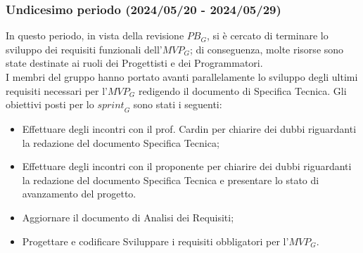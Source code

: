 \subsubsection{Undicesimo periodo (2024/05/20 - 2024/05/29)}
In questo periodo, in vista della revisione $\textit{PB}_G$, si è cercato di terminare lo sviluppo dei requisiti funzionali dell'$\textit{MVP}_G$; di conseguenza, molte risorse sono state destinate ai ruoli dei Progettisti e dei Programmatori. \\
I membri del gruppo hanno portato avanti parallelamente lo sviluppo degli ultimi requisiti necessari per l'$\textit{MVP}_G$ redigendo il documento di Specifica Tecnica.
Gli obiettivi posti per lo $\textit{sprint}_G$ sono stati i seguenti:
\begin{itemize}
    \item Effettuare degli incontri con il prof. Cardin per chiarire dei dubbi riguardanti la redazione del documento Specifica Tecnica;
    \item Effettuare degli incontri con il proponente per chiarire dei dubbi riguardanti la redazione del documento Specifica Tecnica e presentare lo stato di avanzamento del progetto.
    \item Aggiornare il documento di Analisi dei Requisiti;
    \item Progettare e codificare Sviluppare i requisiti obbligatori per l'$\textit{MVP}_G$.
\end{itemize}
